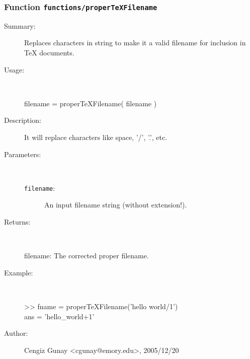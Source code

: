 \subsubsection[Function \texttt{properTeXFilename}]{Function \texttt{functions/properTeXFilename}}%
%
\label{ref_functions__properTeXFilename}%
\hypertarget{ref_functions__properTeXFilename}{}%
\begin{description}
\item[Summary:]Replaces characters in string to make it a valid filename for inclusion in TeX documents.
%
\item[Usage:]~%
\begin{lyxcode}%
filename = properTeXFilename( filename )
%
\end{lyxcode}%
%
\item[Description:]%
It will replace characters like space, '/', '.', etc.
\item[Parameters:]~
\begin{description}%
\item[\texttt{filename}:]
 An input filename string (without extension!).
\end{description}%
%
\item[Returns:]~

 	filename: The corrected proper filename.
%
\item[Example:]~
\begin{lyxcode} >> fname = properTeXFilename('hello world/1')\\%
 ans = 'hello\_world+1' \\%
\end{lyxcode}
%
%
\item[Author:]%
Cengiz Gunay <cgunay@emory.edu>, 2005/12/20%
\end{description}
\methodline%
